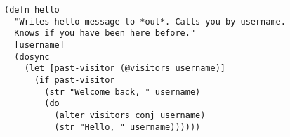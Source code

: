 %
%

\usepackage{listings}
\usepackage[T1]{fontenc}
\usepackage[scaled]{beramono}
\usepackage{tgadventor}
\usepackage[usenames,dvipsnames]{color}
\usepackage[colorlinks=true]{hyperref}



\makeatletter
\gdef\lst@SkipOrPrintLabel{%
    \ifnum\lst@skipnumbers=\z@
        \global\advance\lst@skipnumbers-\lst@stepnumber\relax
        \lst@PlaceNumber
        \lst@numberfirstlinefalse
    \else
        \lst@ifnumberfirstline
            {\def\thelstnumber{Line \@arabic\c@lstnumber}\lst@PlaceNumber}%
            \lst@numberfirstlinefalse
        \else
            {\def\thelstnumber{-}\lst@PlaceNumber}%
        \fi
    \fi
    \global\advance\lst@skipnumbers\@ne}%
\def\lst@maketitle#1{
   \vskip\abovecaptionskip
   \colorbox{titlebox}{
       \scriptsize
       \color{download}\ttfamily\href{http://example.com/#1}{Download}
       \color{title}\sffamily\bfseries#1}
   \vskip\belowcaptionskip}
\makeatother


\begin{lstlisting}[title=examples/introduction.clj]
(defn hello
  "Writes hello message to *out*. Calls you by username.
  Knows if you have been here before."
  [username]
  (dosync
    (let [past-visitor (@visitors username)]
      (if past-visitor
        (str "Welcome back, " username)
        (do
          (alter visitors conj username)
          (str "Hello, " username))))))
\end{lstlisting}
